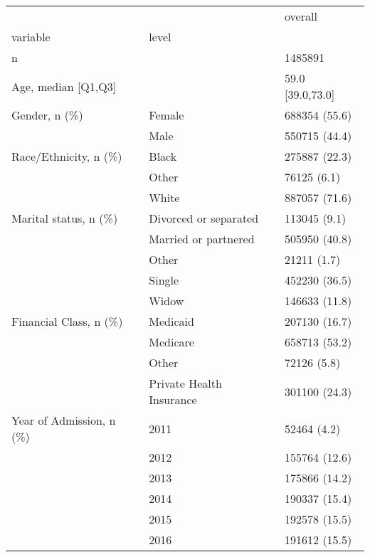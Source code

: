 \begin{tabular}{lll}
\toprule
                                       &   &            overall \\
variable & level &                    \\
\midrule
n &   &            1485891 \\
Age, median [Q1,Q3] &   &   59.0 [39.0,73.0] \\
Gender, n (\%) & Female &      688354 (55.6) \\
                                       & Male &      550715 (44.4) \\
Race/Ethnicity, n (\%) & Black &      275887 (22.3) \\
                                       & Other &        76125 (6.1) \\
                                       & White &      887057 (71.6) \\
Marital status, n (\%) & Divorced or separated &       113045 (9.1) \\
                                       & Married or partnered &      505950 (40.8) \\
                                       & Other &        21211 (1.7) \\
                                       & Single &      452230 (36.5) \\
                                       & Widow &      146633 (11.8) \\
Financial Class, n (\%) & Medicaid &      207130 (16.7) \\
                                       & Medicare &      658713 (53.2) \\
                                       & Other &        72126 (5.8) \\
                                       & Private Health Insurance &      301100 (24.3) \\
Year of Admission, n (\%) & 2011 &        52464 (4.2) \\
                                       & 2012 &      155764 (12.6) \\
                                       & 2013 &      175866 (14.2) \\
                                       & 2014 &      190337 (15.4) \\
                                       & 2015 &      192578 (15.5) \\
                                       & 2016 &      191612 (15.5) \\

\end{tabular}
